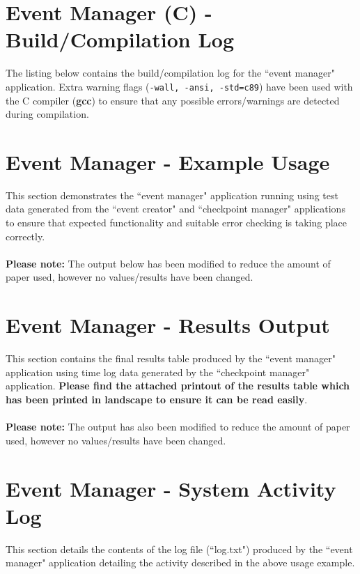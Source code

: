 \documentclass[a4paper, 10pt]{article}
\begin{document}
\clearpage
\section{Event Manager (C) - Build/Compilation Log}

The listing below contains the build/compilation log for the ``event manager" application. Extra warning flags (\verb+-wall, -ansi, -std=c89+) have been used with the C compiler (\textbf{gcc}) to ensure that any possible errors/warnings are detected during compilation. \\



\clearpage
\section{Event Manager - Example Usage}
This section demonstrates the ``event manager" application running using test data generated from the ``event creator" and ``checkpoint manager" applications to ensure that expected functionality and suitable error checking is taking place correctly.\\\\
\textbf{Please note:} The output below has been modified to reduce the amount of paper used, however no values/results have been changed.



\clearpage
\section{Event Manager - Results Output}
This section contains the final results table produced by the ``event manager" application using time log data generated by the ``checkpoint manager" application. \textbf{Please find the attached printout of the results table which has been printed in landscape to ensure it can be read easily}.\\\\
\textbf{Please note:} The output has also been modified to reduce the amount of paper used, however no values/results have been changed.

\clearpage
\section{Event Manager - System Activity Log}
This section details the contents of the log file (``log.txt") produced by the ``event manager" application detailing the activity described in the above usage example.
\end{document}

